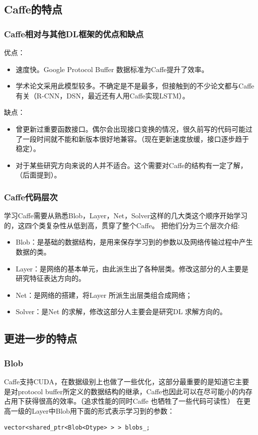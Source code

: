 \documentclass[11pt,fleqn, UTF8]{ctexbook} %
\begin{document}
\subsection{Caffe的特点}
  \subsubsection{Caffe相对与其他DL框架的优点和缺点}

优点：
  \begin{itemize}
    \item 速度快。Google Protocol Buffer 数据标准为Caffe提升了效率。
    \item 学术论文采用此模型较多。不确定是不是最多，但接触到的不少论文都与Caffe 有关（R-CNN，DSN，最近还有人用Caffe实现LSTM）。
  \end{itemize}
缺点：
\begin{itemize}
  \item 曾更新过重要函数接口。偶尔会出现接口变换的情况，很久前写的代码可能过了一段时间就不能和新版本很好地兼容。（现在更新速度放缓，接口逐步趋于稳定）。
  \item 对于某些研究方向来说的人并不适合。这个需要对Caffe的结构有一定了解，（后面提到）。
\end{itemize}
\subsubsection{Caffe代码层次}
学习Caffe需要从熟悉Blob，Layer，Net，Solver这样的几大类这个顺序开始学习的，这四个类复杂性从低到高，贯穿了整个Caffe。 把他们分为三个层次介绍:
\begin{itemize}
  \item Blob：是基础的数据结构，是用来保存学习到的参数以及网络传输过程中产生数据的类。
  \item Layer：是网络的基本单元，由此派生出了各种层类。修改这部分的人主要是研究特征表达方向的。
  \item Net：是网络的搭建，将Layer 所派生出层类组合成网络；
  \item Solver：是Net 的求解，修改这部分人主要会是研究DL 求解方向的。
\end{itemize}
\subsection{更进一步的特点}
\subsubsection{Blob}
Caffe支持CUDA，在数据级别上也做了一些优化，这部分最重要的是知道它主要是对protocol buffer所定义的数据结构的继承，Caffe也因此可以在尽可能小的内存占用下获得很高的效率。（追求性能的同时Caffe 也牺牲了一些代码可读性）
在更高一级的Layer中Blob用下面的形式表示学习到的参数：
\lstset{language=C++}
\begin{lstlisting}[frame=single]
vector<shared_ptr<Blob<Dtype> > > blobs_;

\end{lstlisting}
\end{document}
